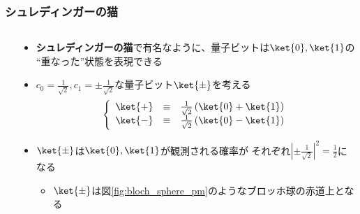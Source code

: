 \begin{frame}
  \frametitle{シュレディンガーの猫}

  \begin{columns}
    \begin{column}{0.4\textwidth}
    \end{column}
    \begin{column}{0.6\textwidth}
      \begin{itemize}
        \item<+-> \textbf{シュレディンガーの猫}で有名なように、量子ビットは$\ket{0}, \ket{1}$の
        ``重なった''状態を表現できる

        \item<+-> $c_0 = \frac{1}{\sqrt{2}}, c_1 = \pm\frac{1}{\sqrt{2}}$な量子ビット$\ket{\pm}$を考える
        \begin{align*}
          \left\{\begin{array}{lcl}
            \ket{+} &\equiv& \frac{1}{\sqrt{2}}\left(\ket{0} + \ket{1}\right) \\
            \ket{-} &\equiv& \frac{1}{\sqrt{2}}\left(\ket{0} - \ket{1}\right)
          \end{array}\right.
        \end{align*}

        \item<+-> $\ket{\pm}$は$\ket{0}, \ket{1}$が観測される確率が
        それぞれ$\left|\pm\frac{1}{\sqrt{2}}\right|^2 = \frac{1}{2}$になる
        \begin{itemize}
          \item $\ket{\pm}$は図\ref{fig:bloch_sphere_pm}のようなブロッホ球の赤道上となる
        \end{itemize}
      \end{itemize}
    \end{column}
  \end{columns}
\end{frame}

